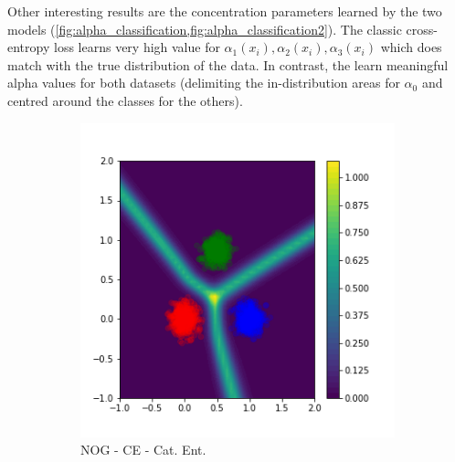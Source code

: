 Other interesting results are the concentration parameters learned by the two models (\cref{fig:alpha_classification,fig:alpha_classification2}). The classic cross-entropy loss learns very high value for $\alpha_1(x_i), \alpha_2(x_i), \alpha_3(x_i)$ which does match with the true distribution of the data. In contrast, the \UncertaintyLoss learn meaningful alpha values for both datasets (delimiting the in-distribution areas for $\alpha_0$ and centred around the classes for the others).

\begin{figure}[H]
\centering
    \begin{subfigure}{0.24\textwidth}
        \centering
        \includegraphics[width=\linewidth]{sections/010_neurips2019/paper/images/classic-narrow-cat_entropy.png}
        \caption{NOG - CE - Cat. Ent.}
        \label{classic-narrow-cat_entropy}
    \end{subfigure}
    \begin{subfigure}{0.24\textwidth}
        \centering

\end{subfigure}
\end{figure}
